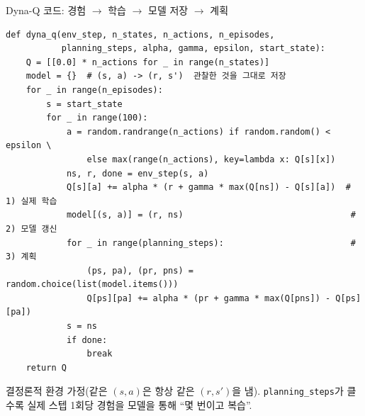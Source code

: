 \documentclass[aspectratio=169,11pt]{beamer}
\begin{document}

\begin{frame}[fragile]{Dyna-Q 코드: 경험 $\to$ 학습 $\to$ 모델 저장 $\to$ 계획}
  \begin{lstlisting}[basicstyle=\ttfamily\scriptsize]
def dyna_q(env_step, n_states, n_actions, n_episodes,
           planning_steps, alpha, gamma, epsilon, start_state):
    Q = [[0.0] * n_actions for _ in range(n_states)]
    model = {}  # (s, a) -> (r, s')  관찰한 것을 그대로 저장
    for _ in range(n_episodes):
        s = start_state
        for _ in range(100):
            a = random.randrange(n_actions) if random.random() < epsilon \
                else max(range(n_actions), key=lambda x: Q[s][x])
            ns, r, done = env_step(s, a)
            Q[s][a] += alpha * (r + gamma * max(Q[ns]) - Q[s][a])  # 1) 실제 학습
            model[(s, a)] = (r, ns)                                 # 2) 모델 갱신
            for _ in range(planning_steps):                         # 3) 계획
                (ps, pa), (pr, pns) = random.choice(list(model.items()))
                Q[ps][pa] += alpha * (pr + gamma * max(Q[pns]) - Q[ps][pa])
            s = ns
            if done:
                break
    return Q
  \end{lstlisting}
  {\footnotesize 결정론적 환경 가정(같은 $(s,a)$은 항상 같은
  $(r,s')$을 냄). \texttt{planning\_steps}가 클수록 실제 스텝 1회당
  경험을 모델을 통해 ``몇 번이고 복습''.}
\end{frame}
\end{document}
